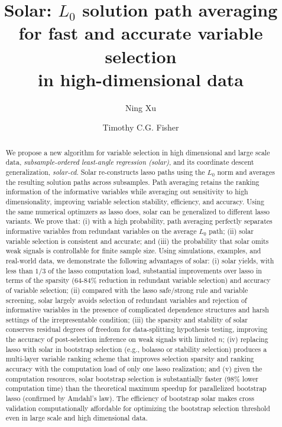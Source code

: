\documentclass[11pt,review,authoryear]{elsarticle}
\begin{document}
\title{Solar: $L_0$ solution path averaging for fast and accurate variable selection\\ in high-dimensional data}

\author{Ning Xu}
\address{School of Economics, University of Sydney, Australia}

\author{Timothy C.G. Fisher}
\address{School of Economics, University of Sydney, Australia}


\begin{abstract}
%
We propose a new algorithm for variable selection in high dimensional and large scale data, \emph{subsample-ordered least-angle regression (solar)}, and its coordinate descent generalization, \emph{solar-cd}. Solar re-constructs lasso paths using the $L_0$ norm and averages the resulting solution paths across subsamples. Path averaging retains the ranking information of the informative variables while averaging out sensitivity to high dimensionality, improving variable selection stability, efficiency, and accuracy. Using the same numerical optimzers as lasso does, solar can be generalized to different lasso variants. We prove that: (i) with a high probability, path averaging perfectly separates informative variables from redundant variables on the average $L_0$ path; (ii) solar variable selection is consistent and accurate; and (iii) the probability that solar omits weak signals is controllable for finite sample size. Using simulations, examples, and real-world data, we demonstrate the following advantages of solar: (i) solar yields, with less than $1/3$ of the lasso computation load, substantial improvements over lasso in terms of the sparsity (64-84\% reduction in redundant variable selection) and accuracy of variable selection; (ii) compared with the lasso safe/strong rule and variable screening, solar largely avoids selection of redundant variables and rejection of informative variables in the presence of complicated dependence structures and harsh settings of the irrepresentable condition; (iii) the sparsity and stability of solar conserves residual degrees of freedom for data-splitting hypothesis testing, improving the accuracy of post-selection inference on weak signals with limited $n$; (iv) replacing lasso with solar in bootstrap selection (e.g., bolasso or stability selection) produces a multi-layer variable ranking scheme that improves selection sparsity and ranking accuracy with the computation load of only one lasso realization; and (v) given the computation resources, solar bootstrap selection is substantially faster (98\% lower computation time) than the theoretical maximum speedup for parallelized bootstrap lasso (confirmed by Amdahl's law). The efficiency of bootstrap solar makes cross validation computationally affordable for optimizing the bootstrap selection threshold even in large scale and high dimensional data.
%
\end{abstract}
\end{document}

